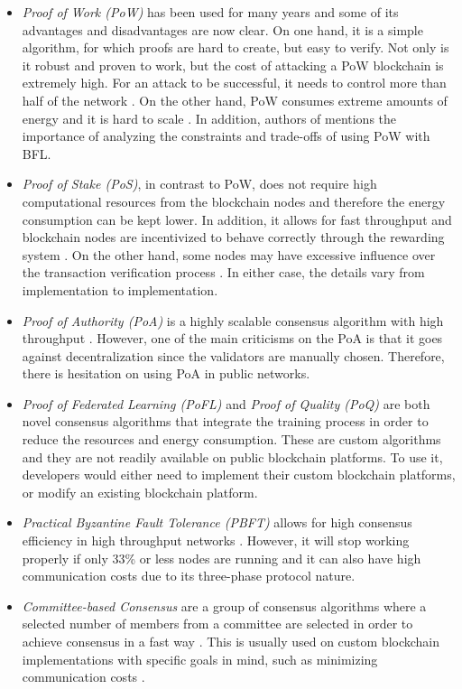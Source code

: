 \begin{itemize}
    \item \textit{Proof of Work (PoW)} has been used for many years and some of its advantages and disadvantages are now clear. On one hand, it is a simple algorithm, for which proofs are hard to create, but easy to verify. Not only is it robust and proven to work, but the cost of attacking a PoW blockchain is extremely high. For an attack to be successful, it needs to control more than half of the network \cite{li_blockchain_2021}. On the other hand, PoW consumes extreme amounts of energy and it is hard to scale \cite{edwood_2020, li_blockchain_2021, ccaf}. In addition, authors of \cite{10.48550/arxiv.2112.07938} mentions the importance of analyzing the constraints and trade-offs of using PoW with BFL.

    \item \textit{Proof of Stake (PoS)}, in contrast to PoW, does not require high computational resources from the blockchain nodes and therefore the energy consumption can be kept lower. In addition, it allows for fast throughput and blockchain nodes are incentivized to behave correctly through the rewarding system \cite{li_blockchain_2021}. On the other hand, some nodes may have excessive influence over the transaction verification process \cite{li_blockchain_2021}. In either case, the details vary from implementation to implementation.
    
    \item \textit{Proof of Authority (PoA)} is a highly scalable consensus algorithm with high throughput \cite{binance_academy_2020}. However, one of the main criticisms on the PoA is that it goes against decentralization since the validators are manually chosen. Therefore, there is hesitation on using PoA in public networks.

    \item \textit{Proof of Federated Learning (PoFL)} \cite{9347812, 10.48550/arxiv.2007.15145} and \textit{Proof of Quality (PoQ)} \cite{8843900} are both novel consensus algorithms that integrate the training process in order to reduce the resources and energy consumption. These are custom algorithms and they are not readily available on public blockchain platforms. To use it, developers would either need to implement their custom blockchain platforms, or modify an existing blockchain platform.

    \item \textit{Practical Byzantine Fault Tolerance (PBFT)} allows for high consensus efficiency in high throughput networks \cite{li_blockchain_2021}. However, it will stop working properly if only 33\% or less nodes are running and it can also have high communication costs due to its three-phase protocol nature.

    \item \textit{Committee-based Consensus} are a group of consensus algorithms where a selected number of members from a committee are selected in order to achieve consensus in a fast way \cite{qu_blockchain-enabled_2022}. This is usually used on custom blockchain implementations with specific goals in mind, such as minimizing communication costs \cite{9293091}.
\end{itemize}

